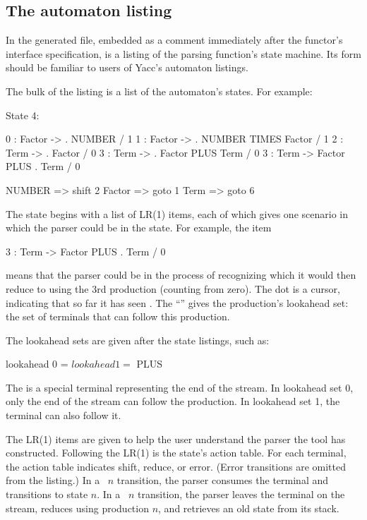 \documentclass[10pt]{article}
\begin{document}
\begin{strictcode}
\begin{strictcode}
\begin{strictcode}
\begin{strictcode}
\begin{strictcode}
\begin{strictcode}
\begin{strictcode}
\subsection{The automaton listing}

In the generated file, embedded as a comment immediately after the
functor's interface specification, is a listing of the parsing
function's state machine.  Its form should be familiar to users of
Yacc's automaton listings.

The bulk of the listing is a list of the automaton's states.  For
example:

\begin{code}
State 4:

0 : Factor -> . NUMBER  / 1
1 : Factor -> . NUMBER TIMES Factor  / 1
2 : Term -> . Factor  / 0
3 : Term -> . Factor PLUS Term  / 0
3 : Term -> Factor PLUS . Term  / 0

NUMBER => shift 2
Factor => goto 1
Term => goto 6
\end{code}

The state begins with a list of LR(1) items, each of which gives one
scenario in which the parser could be in the state.  For example, the
item

\begin{code}
3 : Term -> Factor PLUS . Term  / 0
\end{code}

\noindent
means that the parser could be in the process of recognizing
 which it would then reduce to  using
the 3rd production (counting from zero).  The dot is a cursor,
indicating that so far it has seen
.  The ``'' gives the production's lookahead
set: the set of terminals that can follow this production.

The lookahead sets are given after the state listings, such as:

\begin{code}
lookahead 0 = $ 
lookahead 1 = $ PLUS 
\end{code}

The \cd{$} is a special terminal representing the end of the stream.
In lookahead set 0, only the end of the stream can follow the
production.  In lookahead set 1, the  terminal can also
follow it.

The LR(1) items are given to help the user understand the parser the
tool has constructed.  Following the LR(1) is the state's action table.
For each terminal, the action table indicates shift, reduce, or error.
(Error transitions are omitted from the listing.)  In a ~$n$
transition, the parser consumes the terminal and transitions to state
$n$.  In a ~$n$ transition, the parser leaves the terminal on the
stream, reduces using production $n$, and retrieves an old state from
its stack.


\end{strictcode}
\end{strictcode}
\end{strictcode}
\end{strictcode}
\end{strictcode}
\end{strictcode}
\end{strictcode}
\end{document}
